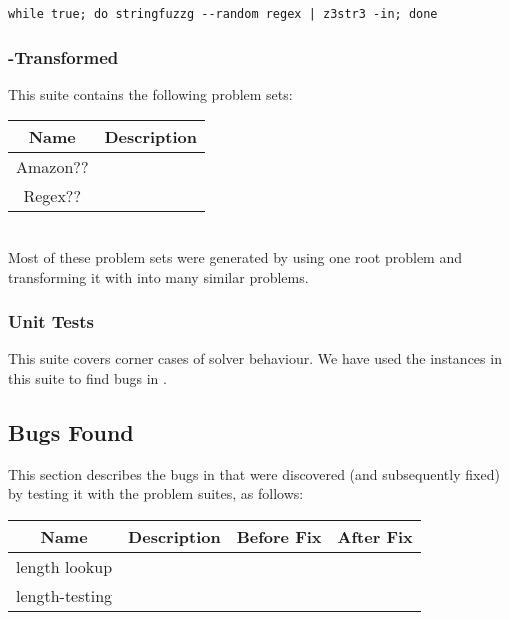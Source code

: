         {\scriptsize\begin{verbatim}
while true; do stringfuzzg --random regex | z3str3 -in; done\end{verbatim}}

    \subsubsection{\fuzzer{}-Transformed}

        This suite contains the following problem sets: \\

        \begin{tabular}{|c|c|}
            \hline
            \textbf{Name} & \textbf{Description} \\ \hline
            Amazon??      & \\ \hline
            Regex??       & \\ \hline
        \end{tabular}

        \hfill \\

        Most of these problem sets were generated by using one root problem and transforming it with \transformer{} into many similar problems.

    \subsubsection{Unit Tests}

        This suite covers corner cases of solver behaviour. We have used the instances in this suite to find bugs in \us{}.

    \subsection{Bugs Found}

        This section describes the bugs in \us{} that were discovered (and subsequently fixed) by testing it with the \fuzzer{} problem suites, as follows: \\

        \begin{tabular}{|c|c|c|c|}
            \hline
            \textbf{Name} & \textbf{Description} & \textbf{Before Fix} & \textbf{After Fix} \\ \hline
            length lookup  & & & \\ \hline
            length-testing & & & \\ \hline
        \end{tabular}
